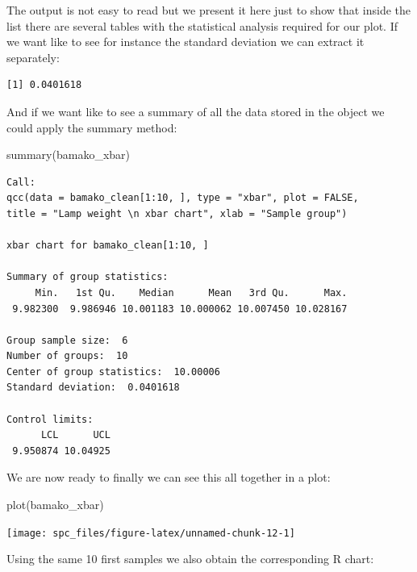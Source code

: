 \documentclass[
]{book}
\newenvironment{Shaded}{\begin{snugshade}}{\end{snugshade}}
\newcommand{\FunctionTok}[1]{\textcolor[rgb]{0.00,0.00,0.00}{#1}}
\newcommand{\NormalTok}[1]{#1}
\newcommand{\SpecialCharTok}[1]{\textcolor[rgb]{0.00,0.00,0.00}{#1}}
\begin{document}
The output is not easy to read but we present it here just to show that inside the list there are several tables with the statistical analysis required for our plot. If we want like to see for instance the standard deviation we can extract it separately:

\begin{Shaded}
\end{Shaded}

\begin{verbatim}
[1] 0.0401618
\end{verbatim}

And if we want like to see a summary of all the data stored in the object we could apply the summary method:

\begin{Shaded}
\begin{Highlighting}[]
\FunctionTok{summary}\NormalTok{(bamako\_xbar)}
\end{Highlighting}
\end{Shaded}

\begin{verbatim}
Call:
qcc(data = bamako_clean[1:10, ], type = "xbar", plot = FALSE,     title = "Lamp weight \n xbar chart", xlab = "Sample group")

xbar chart for bamako_clean[1:10, ] 

Summary of group statistics:
     Min.   1st Qu.    Median      Mean   3rd Qu.      Max. 
 9.982300  9.986946 10.001183 10.000062 10.007450 10.028167 

Group sample size:  6
Number of groups:  10
Center of group statistics:  10.00006
Standard deviation:  0.0401618 

Control limits:
      LCL      UCL
 9.950874 10.04925
\end{verbatim}

We are now ready to finally we can see this all together in a plot:

\begin{Shaded}
\begin{Highlighting}[]
\FunctionTok{plot}\NormalTok{(bamako\_xbar)}
\end{Highlighting}
\end{Shaded}

\texttt{[image: spc\_files/figure-latex/unnamed-chunk-12-1]}

Using the same 10 first samples we also obtain the corresponding R chart:
\end{document}
